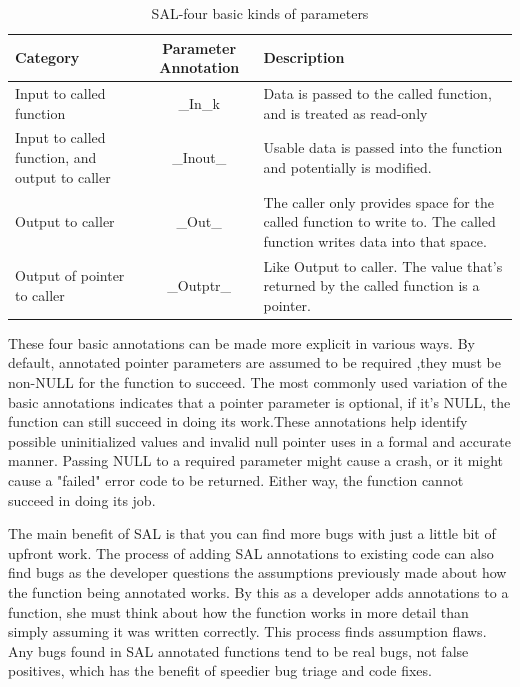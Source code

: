 \begin{table}
	\centering
	\begin{tabular}{|l|c|p{5cm}|}
		\hline
		Category  & Parameter Annotation & Description  \\
		\hline
		
		Input to called function        & \_In\_k  		   & Data is passed to the called function, and 
		is treated as read-only\\
		\hline
		
		Input to called function, and output to caller        & \_Inout\_ & Usable data is passed into the function 
		and potentially is modified. \\ \hline
		Output to caller        & \_Out\_ & The caller only provides space 
		for the called function to write to. 
		The called function writes
		data into that space. \\
		\hline
		
		Output of pointer to caller         & \_Outptr\_  & Like Output to caller. The value that's returned by the called function is a pointer.\\ 	\hline
			
	\end{tabular}
	\caption{SAL-four basic kinds of parameters}
	\label{table:four basic kinds of parameters}
\end{table}

These four basic annotations can be made more explicit in various ways. By default, annotated pointer parameters are assumed to be required ,they must be non-NULL for the function to succeed. The most commonly used variation of the basic annotations indicates that a pointer parameter is optional, if it's NULL, the function can still succeed in doing its work.These annotations help identify possible uninitialized values and invalid null pointer uses in a formal and accurate manner. Passing NULL to a required parameter might cause a crash, or it might cause a "failed" error code to be returned. Either way, the function cannot succeed in doing its job.

The main benefit of SAL is that you can find more bugs with just a little bit of upfront work. The process of adding SAL annotations to existing code can also find bugs as the developer questions the assumptions previously made about how the function being annotated works. By this as a developer adds annotations to a function, she must think about how the function works in more detail than simply assuming it was written correctly. This process finds assumption flaws. Any bugs found in SAL annotated functions tend to be real bugs, not false positives, which has the benefit of speedier bug triage and code fixes.


